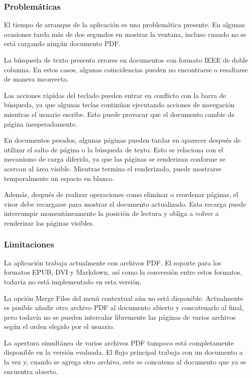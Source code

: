 \subsubsection{Problemáticas}

El tiempo de arranque de la aplicación es una problemática  presente. En algunas ocasiones tarda más de dos segundos en mostrar la ventana, incluso cuando no se está cargando ningún documento PDF.

La búsqueda de texto presenta errores en documentos con formato IEEE de doble columna. En estos casos, algunas coincidencias pueden no encontrarse o resaltarse de manera incorrecta.

Las acciones rápidas del teclado pueden entrar en conflicto con la barra de búsqueda, ya que algunas teclas continúan ejecutando acciones de navegación mientras el usuario escribe. Esto puede provocar que el documento cambie de página inesperadamente.

En documentos pesados, algunas páginas pueden tardar en aparecer después de utilizar el salto de página o la búsqueda de texto. Esto se relaciona con el mecanismo de carga diferida, ya que las páginas se renderizan conforme se acercan al área visible. Mientras termina el renderizado, puede mostrarse temporalmente un espacio en blanco.

Además, después de realizar operaciones como eliminar o reordenar páginas, el visor debe recargarse para mostrar el documento actualizado. Esta recarga puede interrumpir momentáneamente la posición de lectura y obliga a volver a renderizar las páginas visibles.

\subsubsection{Limitaciones}

La aplicación trabaja actualmente con archivos PDF. El soporte para los formatos EPUB, DVI y Markdown, así como la conversión entre estos formatos, todavía no está implementado en esta versión.

La opción Merge Files del menú contextual aún no está disponible. Actualmente es posible añadir otro archivo PDF al documento abierto y concatenarlo al final, pero todavía no se pueden intercalar libremente las páginas de varios archivos según el orden elegido por el usuario.

La apertura simultánea de varios archivos PDF tampoco está completamente disponible en la versión evaluada. El flujo principal trabaja con un documento a la vez y, cuando se agrega otro archivo, este se concatena al documento que ya se encuentra abierto.

